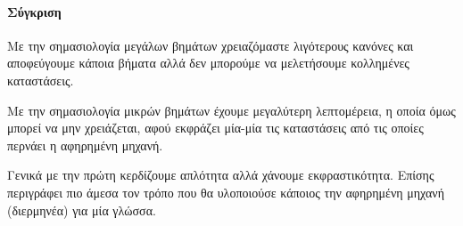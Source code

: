 \documentclass[a4paper,oneside, 12pt, fleqn]{article}
\begin{document}
\paragraph*{Σύγκριση}
Με την σημασιολογία μεγάλων βημάτων χρειαζόμαστε λιγότερους κανόνες και αποφεύγουμε κάποια βήματα αλλά δεν μπορούμε να μελετήσουμε κολλημένες καταστάσεις. 

Με την σημασιολογία μικρών βημάτων έχουμε μεγαλύτερη λεπτομέρεια, η οποία όμως μπορεί να μην χρειάζεται, αφού εκφράζει μία-μία τις καταστάσεις από τις οποίες περνάει η αφηρημένη μηχανή.

Γενικά με την πρώτη κερδίζουμε απλότητα αλλά χάνουμε εκφραστικότητα.
Επίσης περιγράφει πιο άμεσα τον τρόπο που θα υλοποιούσε κάποιος την αφηρημένη μηχανή (διερμηνέα) για μία γλώσσα.
\end{document}
